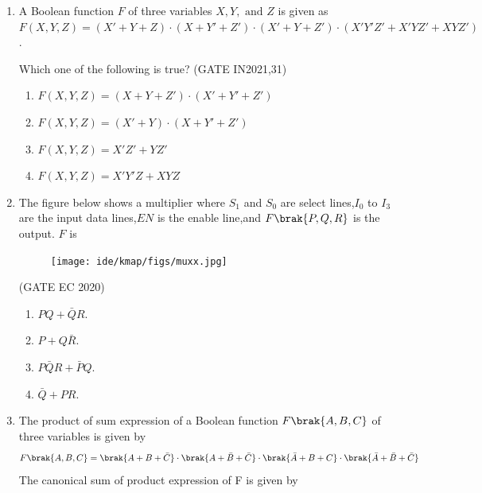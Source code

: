 \begin{enumerate}
\item A Boolean function $F$ of three variables $X, Y, \text{ and } Z$ is given as 
$F(X, Y, Z) = (X' + Y + Z)\cdot(X + Y' + Z') \cdot (X' + Y + Z') \cdot (X'Y'Z' + X' Y Z' + XYZ')$.

Which one of the following is true?
\hfill(GATE IN2021,31)

\begin{enumerate}
    \item $F(X, Y, Z) = (X + Y + Z') \cdot (X' + Y' + Z')$
    \item $F(X, Y, Z) = (X'+ Y) \cdot (X + Y' + Z')$
    \item $F(X, Y, Z) = X'Z' + YZ'$
    \item $F(X, Y, Z) = X'Y'Z + XYZ$
\end{enumerate}
\item The figure below shows a multiplier where $S_{1}$ and $S_{0}$ are select lines,$I_{0}$ to $I_{3}$ are the input data lines,$EN$ is the enable line,and $F\brak{P,Q,R}$ is the output. $F$ is 
    
    \begin{figure}[h]
             \centering
	     \texttt{[image: ide/kmap/figs/muxx.jpg]}
	     \caption{}
	     \label{   }
     \end{figure}
		\hfill(GATE EC 2020)
		\begin{enumerate}[label=(\Alph*)]
			\item $PQ+\bar{Q}R$.
			\item $P+Q\bar{R}$.
		        \item $P\bar{Q}R+\bar{P}Q$.
			\item $\bar{Q}+PR$.
		\end{enumerate}
\item The product of sum expression of a Boolean function $F\brak{A,B,C}$ of three variables is given by
\begin{align*}
F\brak{A,B,C} = \brak{A + B + \bar{C}}\cdot\brak{A + \bar{B} +\bar{C}}\cdot\brak{\bar{A} + B + C}\cdot\brak{\bar{A} + \bar{B} + \bar{C}}
\end{align*}
The canonical sum of product expression of F is  given by


\end{enumerate}
